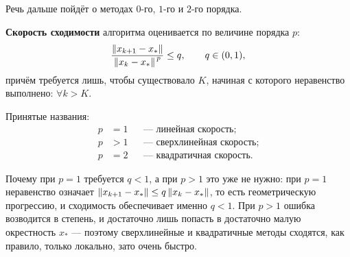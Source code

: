 Речь дальше пойдёт о методах $0$-го, $1$-го и $2$-го порядка.

\begin{definition}
\textbf{Скорость сходимости} алгоритма оценивается по величине порядка $p$:
\[
  \frac{\left\lVert x_{k+1} - x_* \right\rVert}{\left\lVert x_k - x_* \right\rVert^{\,p}} \le q ,
  \qquad q \in (0,1) ,
\]
причём требуется лишь, чтобы существовало $K$, начиная с которого неравенство
выполнено: $\forall k > K$.
\end{definition}

Принятые названия:
\[
  \begin{aligned}
    p &= 1 &&\text{— линейная скорость;} \\
    p &> 1 &&\text{— сверхлинейная скорость;} \\
    p &= 2 &&\text{— квадратичная скорость.}
  \end{aligned}
\]

\begin{idea}
Почему при $p = 1$ требуется $q < 1$, а при $p > 1$ это уже не нужно: при
$p=1$ неравенство означает $\left\lVert x_{k+1}-x_* \right\rVert \le q\left\lVert x_k - x_* \right\rVert$, то есть
геометрическую прогрессию, и сходимость обеспечивает именно $q<1$. При $p > 1$
ошибка возводится в степень, и достаточно лишь попасть в достаточно малую
окрестность $x_*$ — поэтому сверхлинейные и квадратичные методы сходятся, как
правило, только локально, зато очень быстро.
\end{idea}
